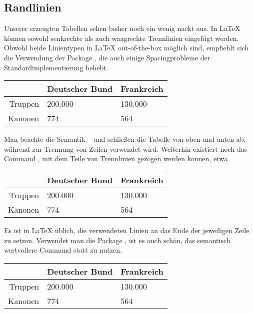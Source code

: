 \subsection{Randlinien}
Unserer erzeugten Tabellen sehen bisher noch ein wenig nackt aus.
In \LaTeX{} können sowohl senkrechte als auch waagrechte Trennlinien eingefügt werden.
Obwohl beide Linientypen in \LaTeX{} out-of-the-box möglich sind, empfiehlt sich die Verwendung der Package , die auch einige Spacingprobleme der Standardimplementierung behebt.
\begin{latexlisting}
	\begin{tabular}{r l l}
		\toprule
		& Deutscher Bund & Frankreich \\ \midrule
		Truppen & 200.000 & 130.000 \\ 
		Kanonen & 774 & 564 \\ \bottomrule
	\end{tabular}
\end{latexlisting}
Man beachte die Semantik --  und  schließen die Tabelle von oben und unten ab, während  zur Trennung von Zeilen verwendet wird.
Weiterhin existiert noch das Command , mit dem Teile von Trennlinien gezogen werden können, etwa
\begin{latexlisting}
	\begin{tabular}{r l l}
		\toprule
		& Deutscher Bund & Frankreich \\ \midrule
		Truppen & 200.000 & 130.000 \\ \cmidrule{2-3}
		Kanonen & 774 & 564 \\ \bottomrule
	\end{tabular}
\end{latexlisting}
Es ist in \LaTeX{} üblich, die verwendeten Linien an das Ende der jeweiligen Zeile zu setzen.
Verwendet man die Package , ist es auch schön, das semantisch wertvollere Command  statt \latexcommand{\textbackslash} zu nutzen.
\begin{latexlisting}
	\begin{tabular}{r l l}
		\toprule
		& Deutscher Bund & Frankreich \tabularnewline \midrule
		Truppen & 200.000 & 130.000 \tabularnewline \cmidrule{2-3}
		Kanonen & 774 & 564 \tabularnewline \bottomrule
	\end{tabular}
\end{latexlisting}

